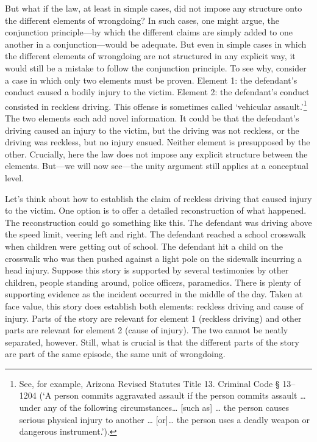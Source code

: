 \documentclass[
  10pt,
  dvipsnames,enabledeprecatedfontcommands]{scrartcl}
\begin{document}
But what if the law, at least in simple cases, did not impose any
structure onto the different elements of wrongdoing? In such cases, one
might argue, the conjunction principle---by which the different claims
are simply added to one another in a conjunction---would be adequate.
But even in simple cases in which the different elements of wrongdoing
are not structured in any explicit way, it would still be a mistake to
follow the conjunction principle. To see why, consider a case in which
only two elements must be proven. Element 1: the defendant's conduct
caused a bodily injury to the victim. Element 2: the defendant's conduct
consisted in reckless driving. This offense is sometimes called
`vehicular assault.'\footnote{See, for example, Arizona Revised Statutes
  Title 13. Criminal Code § 13--1204 (`A person commits aggravated
  assault if the person commits assault \ldots{} under any of the
  following circumstances\ldots{} {[}such as{]} \ldots{} the person
  causes serious physical injury to another \ldots{} {[}or{]}\ldots{}
  the person uses a deadly weapon or dangerous instrument.').} The two
elements each add novel information. It could be that the defendant's
driving caused an injury to the victim, but the driving was not
reckless, or the driving was reckless, but no injury ensued. Neither
element is presupposed by the other. Crucially, here the law does not
impose any explicit structure between the elements. But---we will now
see---the unity argument still applies at a conceptual level.

Let's think about how to establish the claim of reckless driving that
caused injury to the victim. One option is to offer a detailed
reconstruction of what happened. The reconstruction could go something
like this. The defendant was driving above the speed limit, veering left
and right. The defendant reached a school crosswalk when children were
getting out of school. The defendant hit a child on the crosswalk who
was then pushed against a light pole on the sidewalk incurring a head
injury. Suppose this story is supported by several testimonies by other
children, people standing around, police officers, paramedics. There is
plenty of supporting evidence as the incident occurred in the middle of
the day. Taken at face value, this story does establish both elements:
reckless driving and cause of injury. Parts of the story are relevant
for element 1 (reckless driving) and other parts are relevant for
element 2 (cause of injury). The two cannot be neatly separated,
however. Still, what is crucial is that the different parts of the story
are part of the same episode, the same unit of wrongdoing.
\end{document}
